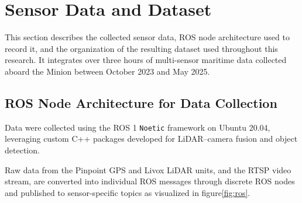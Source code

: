 \documentclass{erauthesis}
\begin{document}

\section{Sensor Data and Dataset}
\label{sec:sensor_data_dataset}


This section describes the collected sensor data, ROS node architecture used to record it, 
and the organization of the resulting dataset used throughout this research.  
It integrates over three hours of multi-sensor maritime data collected aboard the Minion between October 2023 and May 2025.


\subsection{ROS Node Architecture for Data Collection}
\label{sec:ros_architecture}

Data were collected using the ROS 1 \texttt{Noetic} framework on Ubuntu 20.04, 
leveraging custom C++ packages developed for LiDAR–camera fusion and object detection.  

Raw data from the Pinpoint GPS and Livox LiDAR units, and the RTSP video stream, are converted into individual ROS messages through discrete ROS nodes and published to sensor-specific topics as visualized in figure\ref{fig:ros}.
 

\end{document}
